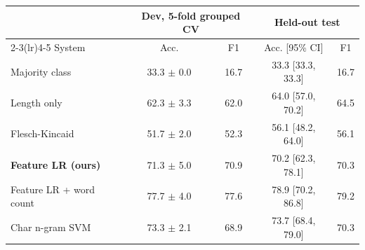 \begin{tabular}{lcccc}
\toprule
 & \multicolumn{2}{c}{Dev, 5-fold grouped CV} & \multicolumn{2}{c}{Held-out test} \\
\cmidrule(lr){2-3}\cmidrule(lr){4-5}
System & Acc. & F1 & Acc. [95\% CI] & F1 \\
\midrule
Majority class & 33.3 $\pm$ 0.0 & 16.7 & 33.3 [33.3, 33.3] & 16.7 \\
Length only & 62.3 $\pm$ 3.3 & 62.0 & 64.0 [57.0, 70.2] & 64.5 \\
Flesch-Kincaid & 51.7 $\pm$ 2.0 & 52.3 & 56.1 [48.2, 64.0] & 56.1 \\
\textbf{Feature LR (ours)} & 71.3 $\pm$ 5.0 & 70.9 & 70.2 [62.3, 78.1] & 70.3 \\
Feature LR + word count & 77.7 $\pm$ 4.0 & 77.6 & 78.9 [70.2, 86.8] & 79.2 \\
Char n-gram SVM & 73.3 $\pm$ 2.1 & 68.9 & 73.7 [68.4, 79.0] & 70.3 \\
\bottomrule
\end{tabular}
